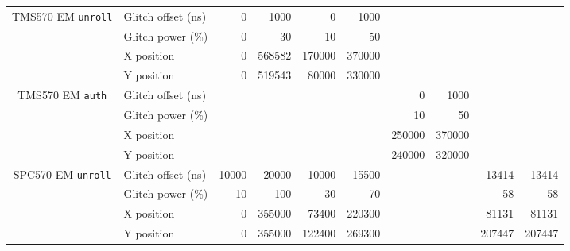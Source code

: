 \documentclass[10pt]{article}
\newcommand{\TI}{TMS570\xspace}
\newcommand{\ST}{SPC570\xspace}
\newcommand{\unroll}{\texttt{unroll}\xspace}
\newcommand{\auth}{\texttt{auth}\xspace}
\begin{document}
\begin{appendices}
\begin{table}[H]
\begin{tabular}{ll rr rr rr rr}
    \midrule

    \multicolumn{1}{c}{\multirow{3}{*}{ \parbox{2cm}{\TI EM \unroll}}}
      & Glitch offset (ns)   
      & 0         & 1000   
      & 0         & 1000   
      &           &        
      &           &          
                \\
      \cmidrule(l){2-10}
      & Glitch power (\%)   
      & 0         & 30    
      & 10        & 50    
      &           &       
      &           &          
                \\
      \cmidrule(l){2-10}
      & X position   
      & 0         & 568582     %
      & 170000    & 370000    %
      &           &               
      &           &              
                \\
      \cmidrule(l){2-10}
      & Y position   
      & 0         & 519543    %
      & 80000     & 330000   %
      &           &              
      &           &             
                \\

    \midrule

    \multicolumn{1}{c}{\multirow{3}{*}{ \parbox{2cm}{\TI EM \auth}}}
      & Glitch offset (ns)   
      &           &        
      &           &        
      & 0         & 1000   
      &           &          
                \\
      \cmidrule(l){2-10}
      & Glitch power (\%)     
      &           &          
      &           &          
      & 10        & 50       
      &           &          
                \\
      \cmidrule(l){2-10}
      & X position   
      &           &          
      &           &          
      & 250000       & 370000  %
      &           &          
                \\
      \cmidrule(l){2-10}
      & Y position   
      &           &          
      &           &          
      & 240000       & 320000 %
      &           &          
                \\

    \midrule

    \multicolumn{1}{c}{\multirow{3}{*}{ \parbox{2cm}{\ST EM \unroll}}}
      & Glitch offset (ns)   
      & 10000     & 20000
      & 10000     & 15500 
      &           &        
      & 13414     & 13414    
      \\
      \cmidrule(l){2-10}
      & Glitch power (\%)     
      & 10        & 100       
      & 30        & 70        
      &           &           
      & 58        & 58      
      \\
      \cmidrule(l){2-10}
      & X position   
      & 0       & 355000   %
      & 73400   & 220300   %
      &         &          
      & 81131   & 81131    
      \\
      \cmidrule(l){2-10}
      & Y position   
      & 0       & 355000   %
      & 122400  & 269300   %
      &         &          
      & 207447  & 207447   
      \\


\end{tabular}
\end{table}
\end{appendices}
\end{document}
